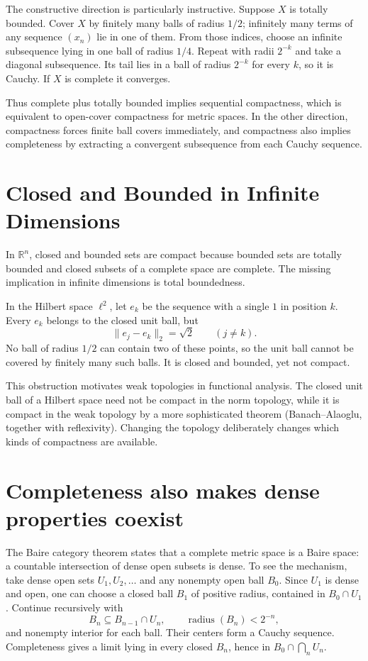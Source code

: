 The constructive direction is particularly instructive. Suppose \(X\) is totally bounded. Cover \(X\) by finitely many balls of radius \(1/2\); infinitely many terms of any sequence \((x_n)\) lie in one of them. From those indices, choose an infinite subsequence lying in one ball of radius \(1/4\). Repeat with radii \(2^{-k}\) and take a diagonal subsequence. Its tail lies in a ball of radius \(2^{-k}\) for every \(k\), so it is Cauchy. If \(X\) is complete it converges.

Thus complete plus totally bounded implies sequential compactness, which is equivalent to open-cover compactness for metric spaces. In the other direction, compactness forces finite ball covers immediately, and compactness also implies completeness by extracting a convergent subsequence from each Cauchy sequence.

\section{Closed and Bounded in Infinite Dimensions}

In \(\mathbb R^n\), closed and bounded sets are compact because bounded sets are totally bounded and closed subsets of a complete space are complete. The missing implication in infinite dimensions is total boundedness.

In the Hilbert space \(\ell^2\), let \(e_k\) be the sequence with a single \(1\) in position \(k\). Every \(e_k\) belongs to the closed unit ball, but
\[
 \|e_j-e_k\|_2=\sqrt2\qquad(j\ne k).
\]
No ball of radius \(1/2\) can contain two of these points, so the unit ball cannot be covered by finitely many such balls. It is closed and bounded, yet not compact.

This obstruction motivates weak topologies in functional analysis. The closed unit ball of a Hilbert space need not be compact in the norm topology, while it is compact in the weak topology by a more sophisticated theorem (Banach--Alaoglu, together with reflexivity). Changing the topology deliberately changes which kinds of compactness are available.

\section{Completeness also makes dense properties coexist}

The Baire category theorem states that a complete metric space is a Baire space: a countable intersection of dense open subsets is dense. To see the mechanism, take dense open sets \(U_1,U_2,\ldots\) and any nonempty open ball \(B_0\). Since \(U_1\) is dense and open, one can choose a closed ball \(B_1\) of positive radius, contained in \(B_0\cap U_1\). Continue recursively with
\[
 B_n\subseteq B_{n-1}\cap U_n,\qquad
 \operatorname{radius}(B_n)<2^{-n},
\]
and nonempty interior for each ball. Their centers form a Cauchy sequence. Completeness gives a limit lying in every closed \(B_n\), hence in \(B_0\cap\bigcap_nU_n\).

